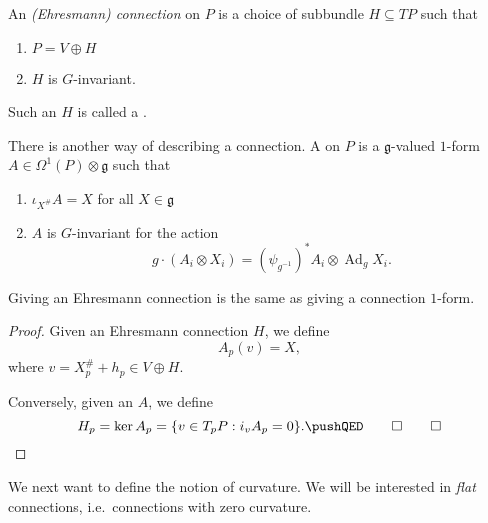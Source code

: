 \documentclass[a4paper]{article}
\DeclareMathOperator{\Ad}{Ad}
\begin{document}
\begin{defi}
  An \emph{(Ehresmann) connection} on $P$ is a choice of subbundle $H \subseteq TP$ such that
  \begin{enumerate}
    \item $P = V \oplus H$
    \item $H$ is $G$-invariant.
  \end{enumerate}
  Such an $H$ is called a .
\end{defi}
There is another way of describing a connection. A  on $P$ is a $\mathfrak{g}$-valued $1$-form $A \in \Omega^1(P) \otimes \mathfrak{g}$ such that
\begin{enumerate}
  \item $\iota_{X^\#} A = X$ for all $X \in \mathfrak{g}$
  \item $A$ is $G$-invariant for the action
    \[
      g \cdot (A_i \otimes X_i) = (\psi_{g^{-1}})^* A_i \otimes \Ad_g X_i.
    \]
\end{enumerate}

\begin{lemma}
  Giving an Ehresmann connection is the same as giving a connection $1$-form.
\end{lemma}

\begin{proof}
  Given an Ehresmann connection $H$, we define
  \[
    A_p(v) = X,
  \]
  where $v = X_p^\# + h_p \in V \oplus H$.

  Conversely, given an $A$, we define
  \[
    H_p = \ker A_p = \{v \in T_p P : i_v A_p = 0\}.\fakeqed
  \]
\end{proof}

We next want to define the notion of curvature. We will be interested in \emph{flat} connections, i.e.\ connections with zero curvature.
\end{document}
